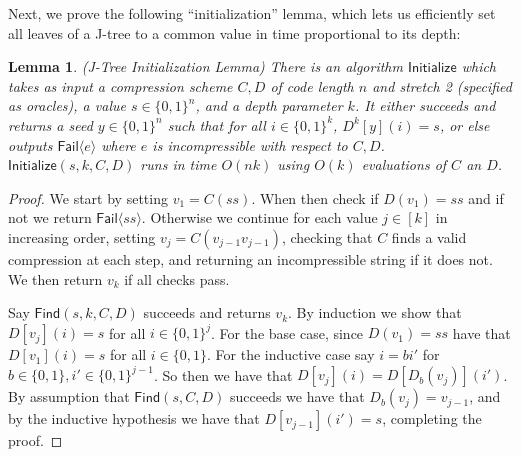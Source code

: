 \documentclass[11pt]{article}
\newtheorem{lemma}{Lemma}
\newcommand{\B}{\{0,1\}}
\begin{document}
Next, we prove the following ``initialization'' lemma, which lets us efficiently set all leaves of a J-tree to a common value in time proportional to its depth:
\begin{lemma}\label{lem:initialization}(J-Tree Initialization Lemma)
There is an algorithm $\mathsf{Initialize}$ which takes as input a compression scheme $C,D$ of code length $n$ and stretch 2 (specified as oracles), a value $s \in \B^n$, and a depth parameter $k$. It either succeeds and returns a seed $y \in \B^n$ such that for all $i \in \B^k$, $D^k[y](i) = s$, or else outputs $\mathsf{Fail}\langle e \rangle$ where $e$ is incompressible with respect to $C,D$. $\mathsf{Initialize}(s,k,C,D)$ runs in time $O(nk)$ using $O(k)$ evaluations of $C$ an $D$.
\end{lemma}
\begin{proof}
We start by setting $v_1 = C(ss)$. When then check if $D(v_1) = ss$ and if not we return $\mathsf{Fail}\langle ss \rangle$. Otherwise we continue for each value $j \in [k]$ in increasing order, setting $v_j = C(v_{j-1}v_{j-1})$, checking that $C$ finds a valid compression at each step, and returning an incompressible string if it does not. We then return $v_k$ if all checks pass. 

Say $\mathsf{Find}(s,k,C,D)$ succeeds and returns $v_k$. By induction we show that $D[v_j](i) = s$ for all $i \in \B^j$. For the base case, since $D(v_1) = ss$ have that $D[v_1](i)=s$ for all $i \in \B$. For the inductive case say $i = bi'$ for $b \in \B, i' \in \B^{j-1}$. So then we have that $D[v_j](i) = D[D_b(v_j)](i')$. By assumption that $\mathsf{Find}(s,C,D)$ succeeds we have that $D_b(v_j) = v_{j-1}$, and by the inductive hypothesis we have that $D[v_{j-1}](i') = s$, completing the proof.
\end{proof}
\end{document}
